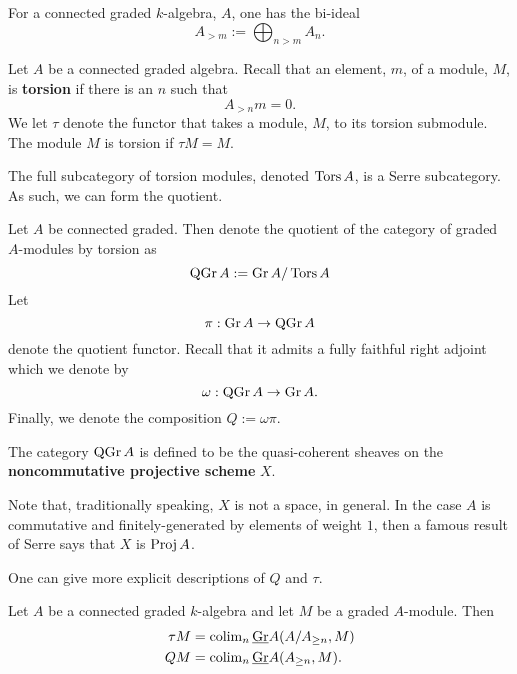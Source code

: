 \documentclass[dissertation.tex]{subfiles}
\begin{document}
For a connected graded \(k\)-algebra, \(A\), one has the bi-ideal
\begin{displaymath}
  A_{>m} :=  \bigoplus_{n>m} A_n.
\end{displaymath}

\begin{definition}
  Let \(A\) be a connected graded algebra. Recall that an element, \(m\), of a module, \(M\), is \textbf{torsion} if there is an \(n\) such that
  \begin{displaymath}
    A_{> n} m = 0.
  \end{displaymath}
  We let \(\tau\) denote the functor that takes a module, \(M\), to its torsion submodule.
  The module \(M\) is torsion if \(\tau M = M\).
\end{definition}

The full subcategory of torsion modules, denoted \(\operatorname{Tors}A\), is a Serre subcategory. As such, we can form the quotient.

\begin{definition}
  Let \(A\) be connected graded. Then denote the quotient of the category of graded \(A\)-modules by torsion as
  \begin{displaymath}
    \operatorname{QGr}A := \operatorname{Gr}A / \operatorname{Tors}A
  \end{displaymath}
  Let
  \begin{displaymath}
    \pi : \operatorname{Gr}A \to \operatorname{QGr}A
  \end{displaymath}
  denote the quotient functor. Recall that it admits a fully faithful right adjoint which we denote by 
  \begin{displaymath}
    \omega : \operatorname{QGr}A \to \operatorname{Gr}A.
  \end{displaymath}
  Finally, we denote the composition \(Q := \omega \pi\). 
  
  The category \(\operatorname{QGr}A\) is defined to be the quasi-coherent sheaves on the \textbf{noncommutative projective scheme} \(X\). 
\end{definition}

\begin{remark}
  Note that, traditionally speaking, \(X\) is not a space, in general. In the case \(A\) is commutative and finitely-generated by elements of weight \(1\), then a famous result of Serre says that \(X\) is \(\operatorname{Proj} A\). 
\end{remark}

One can give more explicit descriptions of \(Q\) and \(\tau\). 

\begin{proposition}
  Let \(A\) be a connected graded \(k\)-algebra and let \(M\) be a graded \(A\)-module. Then 
  \begin{align*}
    \tau M & = \operatorname{colim}_n \underline{\operatorname{Gr}}A(A/A_{\geq n}, M) \\
    Q M & = \operatorname{colim}_n \underline{\operatorname{Gr}}A(A_{\geq n}, M).
  \end{align*}
\end{proposition}
\end{document}
